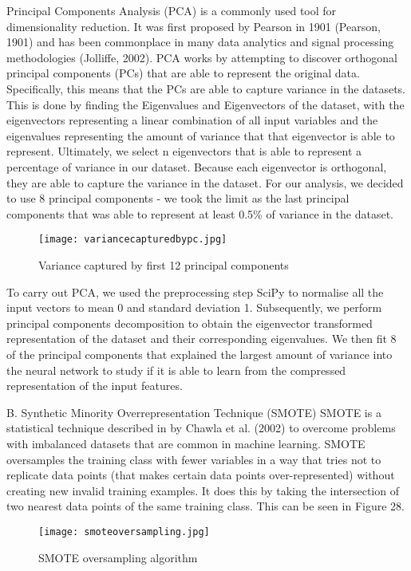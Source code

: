 \documentclass{article}
\begin{document}
Principal Components Analysis (PCA) is a commonly used tool for dimensionality reduction. It was first proposed by Pearson in 1901 (Pearson, 1901) and has been commonplace in many data analytics and signal processing methodologies (Jolliffe, 2002). PCA works by attempting to discover orthogonal principal components (PCs) that are able to represent the original data. Specifically, this means that the PCs are able to capture variance in the datasets. This is done by finding the Eigenvalues and Eigenvectors of the dataset, with the eigenvectors representing a linear combination of all input variables and the eigenvalues representing the amount of variance that that eigenvector is able to represent. Ultimately, we select n eigenvectors that is able to represent a percentage of variance in our dataset. Because each eigenvector is orthogonal, they are able to capture the variance in the dataset. For our analysis, we decided to use 8 principal components - we took the limit as the last principal components that was able to represent at least 0.5\% of variance in the dataset.
 
\begin{figure}[H]
\texttt{[image: variancecapturedbypc.jpg]}
\caption{Variance captured by first 12 principal components}
\centering
\end{figure}

To carry out PCA, we used the preprocessing step SciPy to normalise all the input vectors to mean 0 and standard deviation 1. Subsequently, we perform principal components decomposition to obtain the eigenvector transformed representation of the dataset and their corresponding eigenvalues. We then fit 8 of the principal components that explained the largest amount of variance into the neural network to study if it is able to learn from the compressed representation of the input features. 

B. Synthetic Minority Overrepresentation Technique (SMOTE)
SMOTE is a statistical technique described in by Chawla et al. (2002) to overcome problems with imbalanced datasets that are common in machine learning. SMOTE oversamples the training class with fewer variables in a way that tries not to replicate data points (that makes certain data points over-represented) without creating new invalid training examples. It does this by taking the intersection of two nearest data points of the same training class. This can be seen in Figure 28. 

\begin{figure}[H]
\texttt{[image: smoteoversampling.jpg]}
\caption{SMOTE oversampling algorithm}
\centering
\end{figure}
\end{document}

